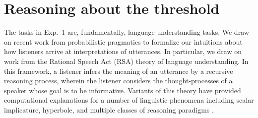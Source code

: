 \documentclass[10pt,letterpaper]{article}
\begin{document}
%
%



\section{Reasoning about the threshold}


The tasks in Exp.~1 are, fundamentally, language understanding tasks. We draw on recent work from probabilistic pragmatics to formalize our intuitions about how listeners arrive at interpretations of utterances. In particular, we draw on work from the Rational Speech Act (RSA) theory of language understanding. In this framework, a listener infers the meaning of an utterance by a recursive reasoning process, wherein the listener considers the thought-processes of a speaker whose goal is to be informative. Variants of this theory have provided computational explanations for a number of linguistic phenomena including scalar implicature, hyperbole, and multiple classes of reasoning paradigms \cite{Kao2014, Tessler2014, Lassiter2014}. 
\end{document}
